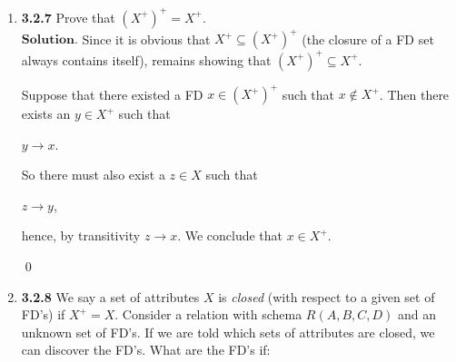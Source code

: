 \documentclass{article}
\theoremstyle{remark}
\begin{document}
\begin{enumerate}
    \item \textbf{3.2.7} Prove that \( (X^+)^+ = X^+ \).\\
    $\textbf{Solution.}$
    Since it is obvious that $X^+ \subseteq (X^+)^+$ (the closure of a FD set always contains itself), remains
    showing that $(X^+)^+ \subseteq X^+$.

    Suppose that there existed a FD $x \in (X^+)^+$ such that $x \notin X^+$.
    Then there exists an $y \in X^+$ such that 
    \begin{center}
        $y \longrightarrow x$.
    \end{center}
    So there must also exist a $z \in X$ such that 
    \begin{center}
        $z \longrightarrow y$,
    \end{center}
    hence, by transitivity $z \longrightarrow x$. We conclude that $x \in X^+$.
    \begin{flushright}
        \qed
    \end{flushright}

    \item \textbf{3.2.8} We say a set of attributes \( X \) is \textit{closed} (with respect to a given set of FD’s) if \( X^+ = X \). Consider a relation with schema \( R(A, B, C, D) \) and an unknown set of FD’s. If we are told which sets of attributes are closed, we can discover the FD’s. What are the FD’s if:


\end{enumerate}
\end{document}
